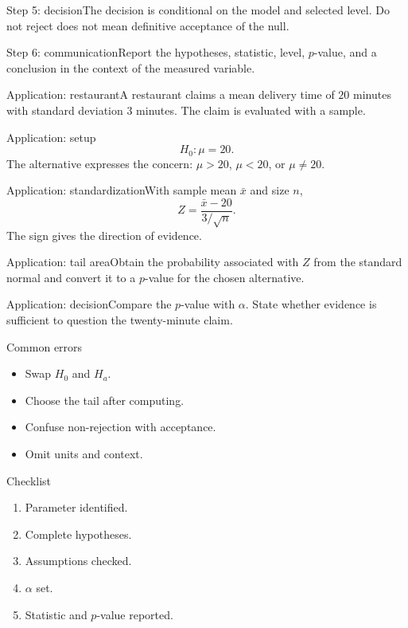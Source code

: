 \documentclass[10pt,aspectratio=169]{beamer}
\begin{document}
\begin{frame}{Step 5: decision}\small The decision is conditional on the model and selected level. Do not reject does not mean definitive acceptance of the null.\end{frame}
\begin{frame}{Step 6: communication}\small Report the hypotheses, statistic, level, $p$-value, and a conclusion in the context of the measured variable.\end{frame}
\begin{frame}{Application: restaurant}\small A restaurant claims a mean delivery time of $20$ minutes with standard deviation $3$ minutes. The claim is evaluated with a sample.\end{frame}
\begin{frame}{Application: setup}\small\[H_0:\mu=20.\]The alternative expresses the concern: $\mu>20$, $\mu<20$, or $\mu\neq20$.\end{frame}
\begin{frame}{Application: standardization}\small With sample mean $\bar x$ and size $n$,\[Z=\frac{\bar x-20}{3/\sqrt n}.\]The sign gives the direction of evidence.\end{frame}
\begin{frame}{Application: tail area}\small Obtain the probability associated with $Z$ from the standard normal and convert it to a $p$-value for the chosen alternative.\end{frame}
\begin{frame}{Application: decision}\small Compare the $p$-value with $\alpha$. State whether evidence is sufficient to question the twenty-minute claim.\end{frame}
\begin{frame}{Common errors}\small\begin{itemize}\item Swap $H_0$ and $H_a$.\item Choose the tail after computing.\item Confuse non-rejection with acceptance.\item Omit units and context.\end{itemize}\end{frame}
\begin{frame}{Checklist}\small\begin{enumerate}\item Parameter identified.\item Complete hypotheses.\item Assumptions checked.\item $\alpha$ set.\item Statistic and $p$-value reported.\end{enumerate}\end{frame}
\end{document}
